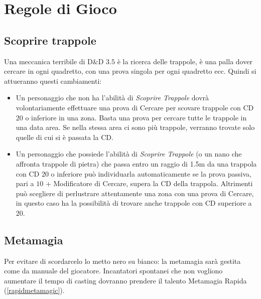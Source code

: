 \documentclass[10pt, a4paper]{report}
\begin{document}
\chapter{Regole di Gioco}
\begin{multicols}{2}

\section{Scoprire trappole}
Una meccanica terribile di D\&D $3.5$ è la ricerca delle trappole, è una palla dover cercare in ogni quadretto, con una prova singola per ogni quadretto ecc.
Quindi si attueranno questi cambiamenti:
\begin{itemize}
	\item Un personaggio che non ha l'abilità di \textit{Scoprire Trappole} dovrà volontariamente effettuare una prova di Cercare per scovare trappole con CD $20$ o inferiore in una zona. Basta una prova per cercare tutte le trappole in una data area. Se nella stessa area ci sono più trappole, verranno trovate solo quelle di cui si è passata la CD.
	\item Un personaggio che possiede l'abilità di \textit{Scoprire Trappole} (o un nano che affronta trappole di pietra) che passa entro un raggio di 1.5m da una trappola con CD $20$ o inferiore può individuarla automaticamente se la prova passiva, pari a $10$ + Modificatore di Cercare, supera la CD della trappola. Altrimenti può scegliere di perlustrare attentamente una zona con una prova di Cercare, in questo caso ha la possibilità di trovare anche trappole con CD superiore a $20$.
\end{itemize}

\section{Metamagia}
Per evitare di scordarcelo lo metto nero su bianco: la metamagia sarà gestita come da manuale del giocatore. Incantatori spontanei che non vogliono aumentare il tempo di casting dovranno prendere il talento Metamagia Rapida (\ref{rapidmetamagic}).

\end{multicols}
\end{document}
